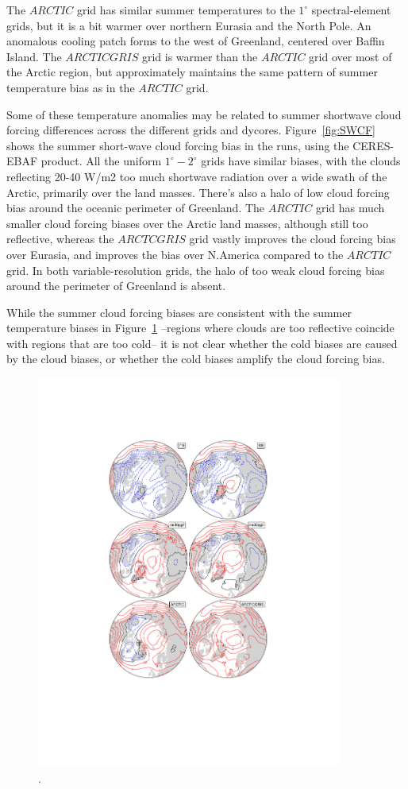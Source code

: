 \documentclass[draft]{agujournal2019}
\begin{document}
The $ARCTIC$ grid has similar summer temperatures to the $1^{\circ}$ spectral-element grids, but it is a bit warmer over northern Eurasia and the North Pole. An anomalous cooling patch forms to the west of Greenland, centered over Baffin Island. The $ARCTICGRIS$ grid is warmer than the $ARCTIC$ grid over most of the Arctic region, but approximately maintains the same pattern of summer temperature bias as in the $ARCTIC$ grid.

Some of these temperature anomalies may be related to summer shortwave cloud forcing differences across the different grids and dycores. Figure~\ref{fig:SWCF} shows the summer short-wave cloud forcing bias in the runs, using the CERES-EBAF product. All the uniform $1^{\circ}-2^{\circ}$ grids have similar biases, with the clouds reflecting 20-40 W/m2 too much shortwave radiation over a wide swath of the Arctic, primarily over the land masses. There's also a halo of low cloud forcing bias around the oceanic perimeter of Greenland. The $ARCTIC$ grid has much smaller cloud forcing biases over the Arctic land masses, although still too reflective, whereas the $ARCTCGRIS$ grid vastly improves the cloud forcing bias over Eurasia, and improves the bias over N.America compared to the $ARCTIC$ grid. In both variable-resolution grids, the halo of too weak cloud forcing bias around the perimeter of Greenland is absent.

While the summer cloud forcing biases are consistent with the summer temperature biases in Figure~\ref{fig:dThyps} --regions where clouds are too reflective coincide with regions that are too cold-- it is not clear whether the cold biases are caused by the cloud biases, or whether the cold biases amplify the cloud forcing bias.

\begin{figure}[t]
\begin{center}
         \includegraphics[width=100mm]{figs/temp_contours_diffERA5_Thyps.pdf}
\end{center}
\caption{.}
\label{fig:dThyps}
\end{figure}
\end{document}
